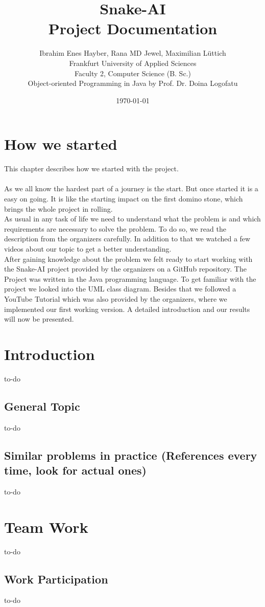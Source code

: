 \documentclass[a4paper,12pt]{article}
\title{Snake-AI\\Project Documentation}
\author{Ibrahim Enes Hayber, Rana MD Jewel, Maximilian Lüttich\\
		Frankfurt University of Applied Sciences\\
		Faculty 2, Computer Science (B. Sc.)\\
		Object-oriented Programming in Java by Prof. Dr. Doina Logofatu
}
\date{\today}
\begin{document}
\maketitle
\newpage
\tableofcontents
\newpage

\section{How we started}
This chapter describes how we started with the project.\\
\\As we all know the hardest part of a journey is the start. But once started it is a easy on going.
It is like the starting impact on the first domino stone, which brings the whole project in rolling.
\\As usual in any task of life we need to understand what the problem is and which requirements are necessary to solve the problem. To do so, we read the description from the organizers carefully. In addition to that we watched a few videos about our topic to get a better understanding.\\
After gaining knowledge about the problem we felt ready to start working with the Snake-AI project provided by the organizers on a GitHub repository. The Project was written in the Java programming language. To get familiar with the project we looked into the UML class
diagram. Besides that we followed a YouTube Tutorial which was also provided by the organizers, where we implemented our first working version. A detailed introduction and our results will now be presented.
\newpage

\section{Introduction}
to-do
\subsection{General Topic}
to-do
\subsection{Similar problems in practice (References every time, look for actual ones)}
to-do

\section{Team Work}
to-do
\subsection{Work Participation}
to-do
\end{document}
